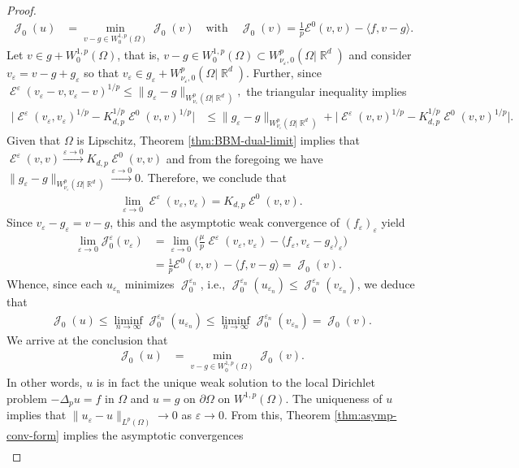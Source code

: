 \documentclass[12pt, reqno]{amsart}%
\theoremstyle{plain}  %
\theoremstyle{definition}  %
\numberwithin{equation}{section}
\DeclareMathOperator{\cE}{\mathcal{E}}
\DeclareMathOperator{\cJ}{\mathcal{J}}
\DeclareMathOperator{\R}{\mathbb{R}}
\newcommand{\eps}{\varepsilon}
\newcommand{\WnuOmRa}{W^p_{\nu_\eps}(\Omega|\R^d )}
\newcommand{\WnuOmRao}{W^p_{\nu_\eps,0}(\Omega|\R^d)}
\begin{document}
\begin{proof}
\begin{align*}
\cJ_0(u)&= \min_{v-g\in W^{1,p}_0(\Omega)} \cJ_0(v)  \quad\text{with}\quad
\cJ_0(v) = \tfrac{1}{p} \mathcal{E}^0(v,v)
- \langle f,v-g\rangle.
\end{align*}
Let $v\in g+W^{1,p}_0(\Omega)$, that is, $v-g\in W^{1,p}_0(\Omega)\subset \WnuOmRao$ and consider $v_\eps=v-g+g_\eps$ so that $v_\eps\in g_\eps+ \WnuOmRao$.  Further, since  $\cE^\eps(v_\eps-v,v_\eps-v)^{1/p}\leq \|g_\eps-g\|_{\WnuOmRa}, $ the triangular inequality implies
\begin{align*}
\big|\cE^\eps(v_\eps,v_\eps)^{1/p}-K^{1/p}_{d,p}\cE^0(v,v)^{1/p}\big|
&\leq  \|g_\eps-g\|_{\WnuOmRa}+ \big|\cE^\eps(v,v)^{1/p}-K^{1/p}_{d,p}\cE^0(v,v)^{1/p}\big|.
\end{align*}
Given that $\Omega$ is Lipschitz, Theorem \ref{thm:BBM-dual-limit} implies that $ \cE^\eps(v,v)\xrightarrow{\eps\to0}K_{d,p}\cE^0(v,v)$  and from the foregoing we have $\|g_\eps-g\|_{\WnuOmRa}\xrightarrow{\eps\to0}0$. Therefore, we conclude that
\begin{align}\label{eq:Eeps-veps-conv}
\lim_{\eps\to0}\cE^\eps(v_\eps,v_\eps)
= K_{d,p}
\cE^0(v,v).
\end{align}
Since $v_\eps-g_\eps= v-g$, this and  the asymptotic weak convergence of $(f_\eps)_\eps$ yield
\begin{align*}
\lim_{\eps\to0}\mathcal{J}^\eps_0(v_\eps)
&= \lim_{\eps\to0}\big(\tfrac{\mu}{p} \cE^\eps(v_\eps, v_\eps)-\langle f_\eps , v_\eps-g_\eps \rangle_\eps \big)\\
&=\tfrac{1}{p}\mathcal{E}^0(v,v) -\langle f ,v-g\rangle = \cJ_0(v).
\end{align*}
Whence, since  each $u_{\eps_n}$ minimizes $\cJ^{\eps_n}_0$, i.e.,  $\cJ_0^{\eps_n}(u_{\eps_n})\leq
\cJ_0^{\eps_n}(v_{\eps_n}) $, we deduce that
\begin{align*}
\cJ_0(u)\leq \liminf_{n\to \infty}\cJ_0^{\eps_n}(u_{\eps_n})\leq
\liminf_{n\to \infty}\cJ_0^{\eps_n}(v_{\eps_n})= \cJ_0(v).
\end{align*}
We arrive at the conclusion that
\begin{align*}
\cJ_0(u)&= \min_{v-g\in W^{1,p}_0(\Omega)} \cJ_0(v).
\end{align*}
In other words, $u$ is in fact the unique weak solution  to the local Dirichlet problem $-\Delta_p u=f$ in $\Omega$ and $u=g$ on $\partial\Omega$ on $W^{1,p}(\Omega)$. The uniqueness of $u$ implies  that $\|u_{\eps}-u\|_{L^p(\Omega)}\to 0$ as $\eps\to0$.
From this, Theorem \ref{thm:asymp-conv-form} implies the asymptotic convergences
\begin{align*}

\end{align*}
\end{proof}
\end{document}
